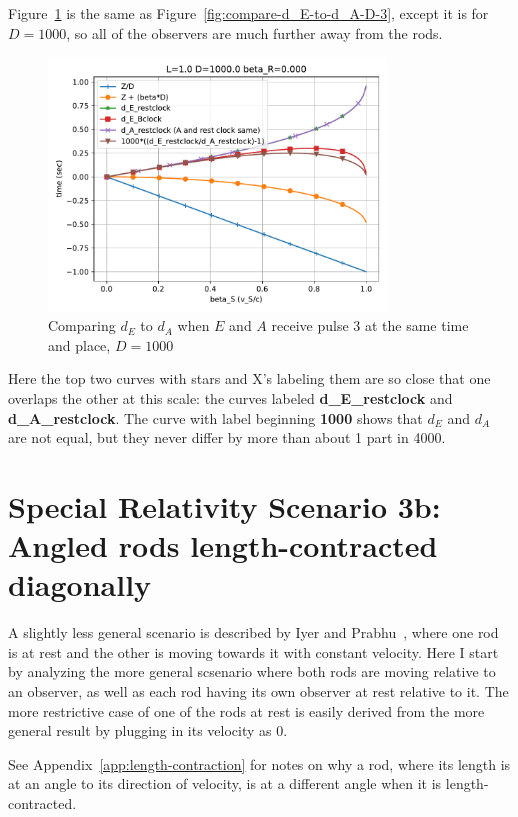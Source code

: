 \documentclass[a4paper]{article}
\theoremstyle{plain}
\theoremstyle{definition}
\begin{document}
Figure~\ref{fig:compare-d_E-to-d_A-D-1000} is the same as
Figure~\ref{fig:compare-d_E-to-d_A-D-3}, except it is for $D=1000$, so
all of the observers are much further away from the rods.
\begin{figure}[h!]
	\centering
	\includegraphics[width=0.8\textwidth]{scen2b-where-E-starts-to-receive-pulse-3-at-A-location-D-1000.0-beta_R-0.000.pdf}
	\caption{Comparing $d_E$ to $d_A$ when $E$ and $A$ receive pulse 3 at the same time and place, $D=1000$}
	\label{fig:compare-d_E-to-d_A-D-1000}
\end{figure}
Here the top two curves with stars and X's labeling them are so close
that one overlaps the other at this scale: the curves labeled
\textbf{d\_E\_restclock} and \textbf{d\_A\_restclock}.
The curve with label beginning \textbf{1000} shows that $d_E$ and
$d_A$ are not equal, but they never differ by more than about 1 part
in 4000.


\section{Special Relativity Scenario 3b: Angled rods length-contracted diagonally}
\label{sec:scen3b}

A slightly less general scenario is described by Iyer and
Prabhu~\cite{IP2006}, where one rod is at rest and the other is moving
towards it with constant velocity.  Here I start by analyzing the more
general scsenario where both rods are moving relative to an observer,
as well as each rod having its own observer at rest relative to it.
The more restrictive case of one of the rods at rest is easily derived
from the more general result by plugging in its velocity as 0.

See Appendix~\ref{app:length-contraction} for notes on why a rod,
where its length is at an angle to its direction of velocity, is at a
different angle when it is length-contracted.
\end{document}
